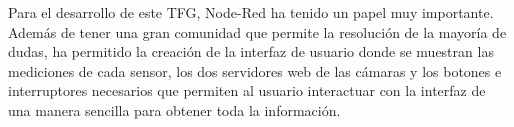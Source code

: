 Para el desarrollo de este TFG, Node-Red ha tenido un papel muy importante. Además de tener una gran comunidad que permite la resolución de la mayoría de dudas, ha permitido la creación de la interfaz de usuario donde se muestran las mediciones de cada sensor, los dos servidores web de las cámaras y los botones e interruptores necesarios que permiten al usuario interactuar con la interfaz de una manera sencilla para obtener toda la información.\\